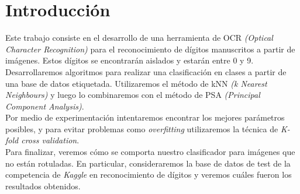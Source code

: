 \section{Introducción}

Este trabajo consiste en el desarrollo de una herramienta de OCR \textit{(Optical Character Recognition)} para el reconocimiento de dígitos manuscritos a partir de imágenes. Estos dígitos se encontrarán aislados y estarán entre 0 y 9. \\

Desarrollaremos algoritmos para realizar una clasificación en clases a partir de una base de datos etiquetada. Utilizaremos el método de kNN \textit{(k Nearest Neighbours)} y luego lo combinaremos con el método de PSA \textit{(Principal Component Analysis)}. \\

Por medio de experimentación intentaremos encontrar los mejores parámetros posibles, y para evitar problemas como \textit{overfitting} utilizaremos la técnica de \textit{K-fold cross validation}. \\

Para finalizar, veremos cómo se comporta nuestro clasificador para imágenes que no están rotuladas. En particular, consideraremos la base de datos de test de la competencia de \textit{Kaggle} en reconocimiento de dígitos y veremos cuáles fueron los resultados obtenidos. \\
